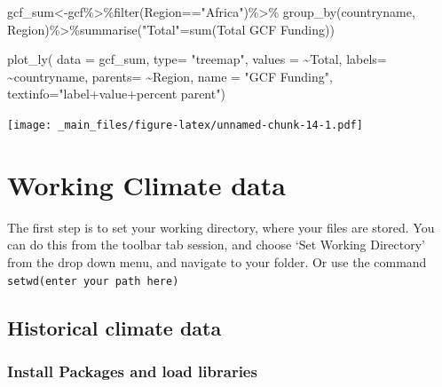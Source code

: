 \documentclass[
]{book}
\newenvironment{Shaded}{\begin{snugshade}}{\end{snugshade}}
\newcommand{\AttributeTok}[1]{\textcolor[rgb]{0.77,0.63,0.00}{#1}}
\newcommand{\FunctionTok}[1]{\textcolor[rgb]{0.00,0.00,0.00}{#1}}
\newcommand{\NormalTok}[1]{#1}
\newcommand{\OtherTok}[1]{\textcolor[rgb]{0.56,0.35,0.01}{#1}}
\newcommand{\SpecialCharTok}[1]{\textcolor[rgb]{0.00,0.00,0.00}{#1}}
\newcommand{\StringTok}[1]{\textcolor[rgb]{0.31,0.60,0.02}{#1}}
\begin{document}
\begin{Shaded}
\begin{Highlighting}[]
\NormalTok{gcf\_sum}\OtherTok{\textless{}{-}}\NormalTok{gcf}\SpecialCharTok{\%\textgreater{}\%}\FunctionTok{filter}\NormalTok{(Region}\SpecialCharTok{==}\StringTok{"Africa"}\NormalTok{)}\SpecialCharTok{\%\textgreater{}\%}
  \FunctionTok{group\_by}\NormalTok{(countryname, Region)}\SpecialCharTok{\%\textgreater{}\%}\FunctionTok{summarise}\NormalTok{(}\StringTok{"Total"}\OtherTok{=}\FunctionTok{sum}\NormalTok{(}\StringTok{\textasciigrave{}}\AttributeTok{Total GCF Funding}\StringTok{\textasciigrave{}}\NormalTok{))}

\FunctionTok{plot\_ly}\NormalTok{(}
  \AttributeTok{data =}\NormalTok{ gcf\_sum,}
  \AttributeTok{type=} \StringTok{"treemap"}\NormalTok{,}
  \AttributeTok{values =} \SpecialCharTok{\textasciitilde{}}\NormalTok{Total,}
  \AttributeTok{labels=} \SpecialCharTok{\textasciitilde{}}\NormalTok{countryname,}
  \AttributeTok{parents=} \SpecialCharTok{\textasciitilde{}}\NormalTok{Region,}
  \AttributeTok{name =} \StringTok{"GCF Funding"}\NormalTok{,}
  \AttributeTok{textinfo=}\StringTok{"label+value+percent parent"}\NormalTok{)}
\end{Highlighting}
\end{Shaded}

\texttt{[image: \_main\_files/figure-latex/unnamed-chunk-14-1.pdf]}

\hypertarget{working-climate-data}{%
\chapter{Working Climate data}\label{working-climate-data}}

The first step is to set your working directory, where your files are stored. You can do this from the toolbar tab session, and choose `Set Working Directory' from the drop down menu, and navigate to your folder. Or use the command \texttt{setwd(enter\ your\ path\ here)}

\hypertarget{historical-climate-data}{%
\section{Historical climate data}\label{historical-climate-data}}

\hypertarget{install-packages-and-load-libraries}{%
\subsection{Install Packages and load libraries}\label{install-packages-and-load-libraries}}
\end{document}
